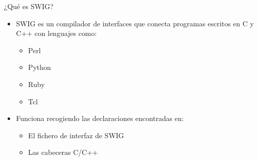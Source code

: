\documentclass{beamer}
\begin{document}
\begin{frame}{¿Qué es SWIG?}
  \begin{itemize}
    \item SWIG es un compilador de interfaces que conecta programas escritos en C y C++ con lenguajes como:
    \begin{itemize}
        \item Perl
        \item Python
        \item Ruby
        \item Tcl
    \end{itemize}
    \medskip
    \item Funciona recogiendo las declaraciones encontradas en:
    \begin{itemize}
      \item El fichero de interfaz de SWIG
      \item Las cabeceras C/C++
    \end{itemize}
  \end{itemize}
\end{frame}


\end{document}
